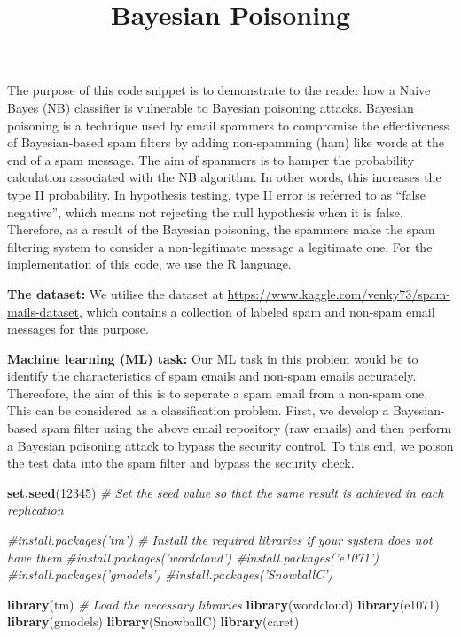 \documentclass[]{article}
\title{Bayesian Poisoning}
\author{}
\date{}
\newenvironment{Shaded}{\begin{snugshade}}{\end{snugshade}}
\newcommand{\CommentTok}[1]{\textcolor[rgb]{0.56,0.35,0.01}{\textit{#1}}}
\newcommand{\DecValTok}[1]{\textcolor[rgb]{0.00,0.00,0.81}{#1}}
\newcommand{\KeywordTok}[1]{\textcolor[rgb]{0.13,0.29,0.53}{\textbf{#1}}}
\newcommand{\NormalTok}[1]{#1}
\begin{document}
\maketitle

The purpose of this code snippet is to demonstrate to the reader how a
Naive Bayes (NB) classiﬁer is vulnerable to Bayesian poisoning attacks.
Bayesian poisoning is a technique used by email spammers to compromise
the eﬀectiveness of Bayesian-based spam ﬁlters by adding non-spamming
(ham) like words at the end of a spam message. The aim of spammers is to
hamper the probability calculation associated with the NB algorithm. In
other words, this increases the type II probability. In hypothesis
testing, type II error is referred to as ``false negative'', which means
not rejecting the null hypothesis when it is false. Therefore, as a
result of the Bayesian poisoning, the spammers make the spam filtering
system to consider a non-legitimate message a legitimate one. For the
implementation of this code, we use the R language.

\textbf{The dataset:} We utilise the dataset at
\url{https://www.kaggle.com/venky73/spam-mails-dataset}, which contains
a collection of labeled spam and non-spam email messages for this
purpose.

\textbf{Machine learning (ML) task:} Our ML task in this problem would
be to identify the characteristics of spam emails and non-spam emails
accurately. Thereofore, the aim of this is to seperate a spam email from
a non-spam one. This can be considered as a classiﬁcation problem.
First, we develop a Bayesian-based spam ﬁlter using the above email
repository (raw emails) and then perform a Bayesian poisoning attack to
bypass the security control. To this end, we poison the test data into
the spam ﬁlter and bypass the security check.

\begin{Shaded}
\begin{Highlighting}[]
\KeywordTok{set.seed}\NormalTok{(}\DecValTok{12345}\NormalTok{) }\CommentTok{# Set the seed value so that the same result is achieved in each replication}

\CommentTok{#install.packages('tm') # Install the required libraries if your system does not have them}
\CommentTok{#install.packages('wordcloud')}
\CommentTok{#install.packages('e1071')}
\CommentTok{#install.packages('gmodels')}
\CommentTok{#install.packages('SnowballC')}

\KeywordTok{library}\NormalTok{(tm) }\CommentTok{# Load the necessary libraries}
\KeywordTok{library}\NormalTok{(wordcloud)}
\KeywordTok{library}\NormalTok{(e1071)}
\KeywordTok{library}\NormalTok{(gmodels)}
\KeywordTok{library}\NormalTok{(SnowballC)}
\KeywordTok{library}\NormalTok{(caret)}
\end{Highlighting}
\end{Shaded}
\end{document}
